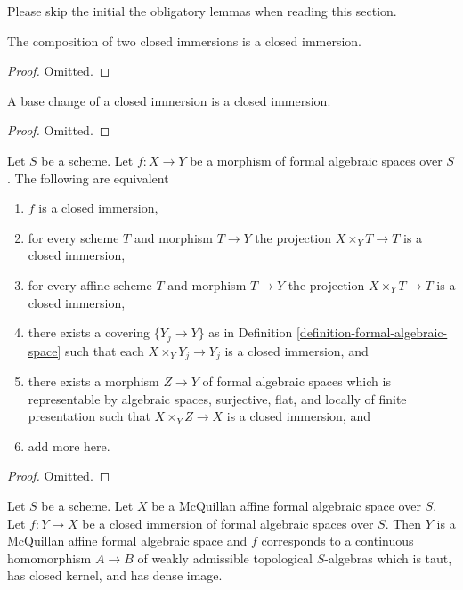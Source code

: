 \noindent
Please skip the initial the obligatory lemmas when reading this section.

\begin{lemma}
\label{lemma-composition-closed-immersion}
The composition of two closed immersions is a closed immersion.
\end{lemma}

\begin{proof}
Omitted.
\end{proof}

\begin{lemma}
\label{lemma-base-change-closed-immersion}
A base change of a closed immersion is a closed immersion.
\end{lemma}

\begin{proof}
Omitted.
\end{proof}

\begin{lemma}
\label{lemma-characterize-closed-immersion}
Let $S$ be a scheme. Let $f : X \to Y$ be a morphism of formal algebraic
spaces over $S$. The following are equivalent
\begin{enumerate}
\item $f$ is a closed immersion,
\item for every scheme $T$ and morphism $T \to Y$ the projection
$X \times_Y T \to T$ is a closed immersion,
\item for every affine scheme $T$ and morphism $T \to Y$
the projection $X \times_Y T \to T$ is a closed immersion,
\item there exists a covering $\{Y_j \to Y\}$ as in
Definition \ref{definition-formal-algebraic-space}
such that each $X \times_Y Y_j \to Y_j$ is a closed immersion, and
\item there exists a morphism $Z \to Y$ of formal algebraic spaces
which is representable by algebraic spaces, surjective, flat, and locally
of finite presentation such that $X \times_Y Z \to X$ is a
closed immersion, and
\item add more here.
\end{enumerate}
\end{lemma}

\begin{proof}
Omitted.
\end{proof}

\begin{lemma}
\label{lemma-closed-immersion-into-McQuillan}
Let $S$ be a scheme. Let $X$ be a McQuillan affine formal algebraic space
over $S$. Let $f : Y \to X$ be a closed immersion of formal algebraic spaces
over $S$. Then $Y$ is a McQuillan affine formal algebraic space and
$f$ corresponds to a continuous homomorphism $A \to B$ of weakly admissible
topological $S$-algebras which is taut, has closed kernel, and has
dense image.
\end{lemma}

